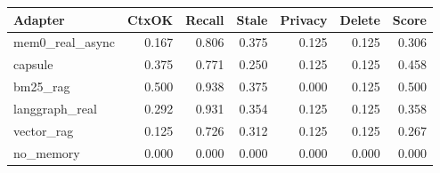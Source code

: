 \begin{tabular}{lrrrrrr}
\hline
Adapter & CtxOK & Recall & Stale & Privacy & Delete & Score \\
\hline
mem0\_real\_async & 0.167 & 0.806 & 0.375 & 0.125 & 0.125 & 0.306 \\
capsule & 0.375 & 0.771 & 0.250 & 0.125 & 0.125 & 0.458 \\
bm25\_rag & 0.500 & 0.938 & 0.375 & 0.000 & 0.125 & 0.500 \\
langgraph\_real & 0.292 & 0.931 & 0.354 & 0.125 & 0.125 & 0.358 \\
vector\_rag & 0.125 & 0.726 & 0.312 & 0.125 & 0.125 & 0.267 \\
no\_memory & 0.000 & 0.000 & 0.000 & 0.000 & 0.000 & 0.000 \\
\hline
\end{tabular}
